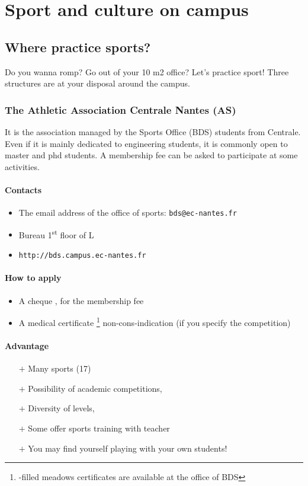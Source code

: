 \section{Sport and culture on campus}
\subsection {Where practice sports?}
Do you wanna romp? Go out of your 10 m2 office?  Let's practice sport! Three structures are at your disposal around the campus.

\subsubsection{The Athletic Association Centrale Nantes (AS)}
It is the association managed by the Sports Office (BDS) students from Centrale. Even if it is mainly dedicated to engineering students, it is commonly open to master and phd students. A membership fee can be asked to participate at some activities.
\paragraph{Contacts}
\begin{itemize}
  \item The email address of the office of sports: \texttt{bds@ec-nantes.fr}
  \item Bureau 1\textsuperscript{st} floor of L
  \item \texttt{http://bds.campus.ec-nantes.fr}
\end {itemize}
\paragraph{How to apply}
\begin{itemize}
  \item A cheque , for the membership fee
  \item A medical certificate \footnote{-filled meadows certificates are available at the office of BDS} non-cons-indication (if you specify the competition)
\end{itemize}

\paragraph{Advantage}
\begin{itemize}
  \item [$+$] Many sports (17)
  \item [$+$] Possibility of academic competitions,
  \item [$+$] Diversity of levels,
  \item [$+$] Some offer sports training with teacher
  \item [$+$] You may find yourself playing with your own students!
\end{itemize}
